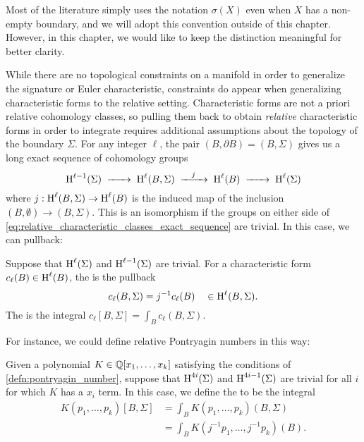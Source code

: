 \begin{convention*}
	Most of the literature simply uses the notation $\sigma(X)$ even when $X$ has a non-empty boundary, and we will adopt this convention outside of this chapter. However, in this chapter, we would like to keep the distinction meaningful for better clarity.
\end{convention*}

While there are no topological constraints on a manifold in order to generalize the signature or Euler characteristic, constraints do appear when generalizing characteristic forms to the relative setting.
Characteristic forms are not a priori relative cohomology classes, so pulling them back to obtain \emph{relative} characteristic forms in order to integrate requires additional assumptions about the topology of the boundary $\Sigma$.
For any integer $\ell$, the pair $(B, \partial B) = (B, \Sigma)$ gives us a long exact sequence of cohomology groups
\begin{equation}\label{eq:relative_characteristic_classes_exact_sequence}
	\H^{\ell-1}(\Sigma) \lkxto \H^{\ell}(B, \Sigma) \lkxto[j] \H^{\ell}(B) \lkxto \H^{\ell}(\Sigma)
\end{equation}
where $j : \operatorname{H}^{\ell}(B, \Sigma) \to \operatorname{H}^{\ell}(B)$ is the induced map of the inclusion $(B,\emptyset) \to (B, \Sigma)$. This is an isomorphism if the groups on either side of \cref{eq:relative_characteristic_classes_exact_sequence} are trivial. In this case, we can pullback:

\begin{definition}\label{defn:relative_characteristic_form}
	Suppose that $\operatorname{H}^{\ell}(\Sigma)$ and $\operatorname{H}^{\ell-1}(\Sigma)$ are trivial. For a characteristic form $c_\ell(B) \in \operatorname{H}^{\ell}(B)$, the  is the pullback
	\[
		c_\ell(B, \Sigma) = j^{-1} c_\ell(B) \quad\in \operatorname{H}^{\ell}(B, \Sigma).
	\]
	The  is the integral $c_\ell[B,\Sigma]=\int_B c_\ell(B,\Sigma)$.
\end{definition}

For instance, we could define relative Pontryagin numbers in this way:

\begin{definition}\label{defn:relative_pontryagin_number}
	Given a polynomial $K\in \mathbb{Q}[x_1,\ldots, x_k]$ satisfying the conditions of \cref{defn:pontryagin_number}, suppose that $\operatorname{H}^{4i}(\Sigma)$ and $\operatorname{H}^{4i-1}(\Sigma)$ are trivial for all $i$ for which $K$ has a $x_i$ term.
	In this case, we define the  to be the integral
	\[
		\begin{aligned}
			K(p_1, \ldots, p_k)[B,\Sigma]
			 & = \int_B K(p_1, \ldots, p_k)(B,\Sigma)       \\
			 & = \int_B K(j^{-1}p_1, \ldots, j^{-1}p_k)(B).
		\end{aligned}
	\]
\end{definition}

